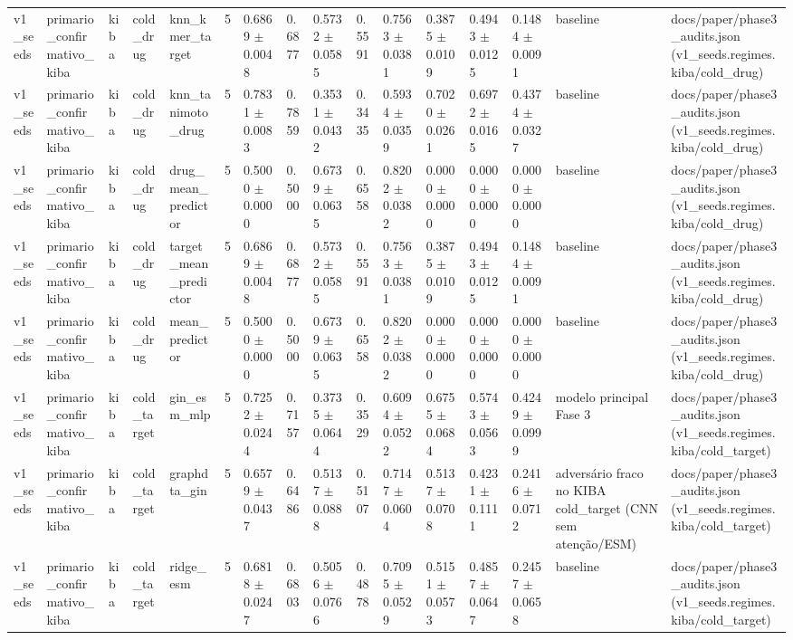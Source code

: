 \begin{table}[htbp]
\begin{tabular}{llllllllllllllll}
v1\_seeds & primario\_confirmativo\_kiba & kiba & cold\_drug & knn\_kmer\_target & 5 & 0.6869 $\pm$ 0.0048 & 0.6877 & 0.5732 $\pm$ 0.0585 & 0.5591 & 0.7563 $\pm$ 0.0381 & 0.3875 $\pm$ 0.0109 & 0.4943 $\pm$ 0.0125 & 0.1484 $\pm$ 0.0091 & baseline & docs/paper/phase3\_audits.json (v1\_seeds.regimes.kiba/cold\_drug) \\
v1\_seeds & primario\_confirmativo\_kiba & kiba & cold\_drug & knn\_tanimoto\_drug & 5 & 0.7831 $\pm$ 0.0083 & 0.7859 & 0.3531 $\pm$ 0.0432 & 0.3435 & 0.5934 $\pm$ 0.0359 & 0.7020 $\pm$ 0.0261 & 0.6972 $\pm$ 0.0165 & 0.4374 $\pm$ 0.0327 & baseline & docs/paper/phase3\_audits.json (v1\_seeds.regimes.kiba/cold\_drug) \\
v1\_seeds & primario\_confirmativo\_kiba & kiba & cold\_drug & drug\_mean\_predictor & 5 & 0.5000 $\pm$ 0.0000 & 0.5000 & 0.6739 $\pm$ 0.0635 & 0.6558 & 0.8202 $\pm$ 0.0382 & 0.0000 $\pm$ 0.0000 & 0.0000 $\pm$ 0.0000 & 0.0000 $\pm$ 0.0000 & baseline & docs/paper/phase3\_audits.json (v1\_seeds.regimes.kiba/cold\_drug) \\
v1\_seeds & primario\_confirmativo\_kiba & kiba & cold\_drug & target\_mean\_predictor & 5 & 0.6869 $\pm$ 0.0048 & 0.6877 & 0.5732 $\pm$ 0.0585 & 0.5591 & 0.7563 $\pm$ 0.0381 & 0.3875 $\pm$ 0.0109 & 0.4943 $\pm$ 0.0125 & 0.1484 $\pm$ 0.0091 & baseline & docs/paper/phase3\_audits.json (v1\_seeds.regimes.kiba/cold\_drug) \\
v1\_seeds & primario\_confirmativo\_kiba & kiba & cold\_drug & mean\_predictor & 5 & 0.5000 $\pm$ 0.0000 & 0.5000 & 0.6739 $\pm$ 0.0635 & 0.6558 & 0.8202 $\pm$ 0.0382 & 0.0000 $\pm$ 0.0000 & 0.0000 $\pm$ 0.0000 & 0.0000 $\pm$ 0.0000 & baseline & docs/paper/phase3\_audits.json (v1\_seeds.regimes.kiba/cold\_drug) \\
v1\_seeds & primario\_confirmativo\_kiba & kiba & cold\_target & gin\_esm\_mlp & 5 & 0.7252 $\pm$ 0.0244 & 0.7157 & 0.3735 $\pm$ 0.0644 & 0.3529 & 0.6094 $\pm$ 0.0522 & 0.6755 $\pm$ 0.0684 & 0.5743 $\pm$ 0.0563 & 0.4249 $\pm$ 0.0999 & modelo principal Fase 3 & docs/paper/phase3\_audits.json (v1\_seeds.regimes.kiba/cold\_target) \\
v1\_seeds & primario\_confirmativo\_kiba & kiba & cold\_target & graphdta\_gin & 5 & 0.6579 $\pm$ 0.0437 & 0.6486 & 0.5137 $\pm$ 0.0888 & 0.5107 & 0.7147 $\pm$ 0.0604 & 0.5137 $\pm$ 0.0708 & 0.4231 $\pm$ 0.1111 & 0.2416 $\pm$ 0.0712 & adversário fraco no KIBA cold\_target (CNN sem atenção/ESM) & docs/paper/phase3\_audits.json (v1\_seeds.regimes.kiba/cold\_target) \\
v1\_seeds & primario\_confirmativo\_kiba & kiba & cold\_target & ridge\_esm & 5 & 0.6818 $\pm$ 0.0247 & 0.6803 & 0.5056 $\pm$ 0.0766 & 0.4878 & 0.7095 $\pm$ 0.0529 & 0.5151 $\pm$ 0.0573 & 0.4857 $\pm$ 0.0647 & 0.2457 $\pm$ 0.0658 & baseline & docs/paper/phase3\_audits.json (v1\_seeds.regimes.kiba/cold\_target) \\

\end{tabular}
\end{table}
